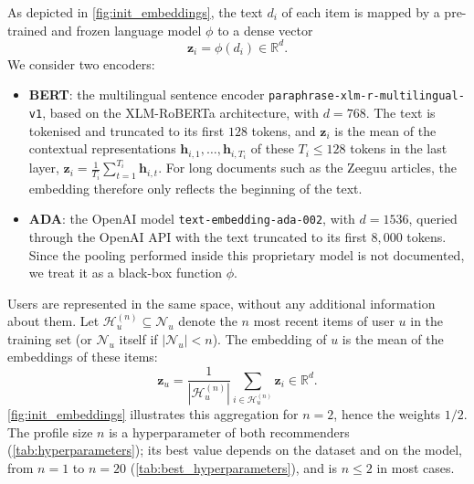 \subsubsection{}
\label{subsubsec:rs_embeddings}

\begin{mmblock}
As depicted in \autoref{fig:init_embeddings}, the text $d_i$ of each item is mapped by a pre-trained and frozen language model $\phi$ to a dense vector
\begin{equation}
    \mathbf{z}_i = \phi(d_i) \in \mathbb{R}^{d}.
    \label{eq:item_embedding_init}
\end{equation}
We consider two encoders:
\begin{itemize}
    \item \textbf{BERT}: the multilingual sentence encoder \texttt{paraphrase-xlm-r-multilingual-v1}, based on the XLM-RoBERTa architecture, with $d = 768$. The text is tokenised and truncated to its first $128$ tokens, and $\mathbf{z}_i$ is the mean of the contextual representations $\mathbf{h}_{i,1}, \dots, \mathbf{h}_{i,T_i}$ of these $T_i \le 128$ tokens in the last layer, $\mathbf{z}_i = \frac{1}{T_i} \sum_{t=1}^{T_i} \mathbf{h}_{i,t}$. For long documents such as the Zeeguu articles, the embedding therefore only reflects the beginning of the text.
    \item \textbf{ADA}: the OpenAI model \texttt{text-embedding-ada-002}, with $d = 1536$, queried through the OpenAI API with the text truncated to its first $8{,}000$ tokens. Since the pooling performed inside this proprietary model is not documented, we treat it as a black-box function $\phi$.
\end{itemize}
Users are represented in the same space, without any additional information about them. Let $\mathcal{H}_u^{(n)} \subseteq \mathcal{N}_u$ denote the $n$ most recent items of user $u$ in the training set (or $\mathcal{N}_u$ itself if $|\mathcal{N}_u| < n$). The embedding of $u$ is the mean of the embeddings of these items:
\begin{equation}
    \mathbf{z}_u = \frac{1}{|\mathcal{H}_u^{(n)}|} \sum_{i \in \mathcal{H}_u^{(n)}} \mathbf{z}_i \in \mathbb{R}^{d}.
    \label{eq:user_embedding_init}
\end{equation}
\autoref{fig:init_embeddings} illustrates this aggregation for $n = 2$, hence the weights $1/2$. The profile size $n$ is a hyperparameter of both recommenders (\autoref{tab:hyperparameters}); its best value depends on the dataset and on the model, from $n = 1$ to $n = 20$ (\autoref{tab:best_hyperparameters}), and is $n \le 2$ in most cases.
\end{mmblock}

